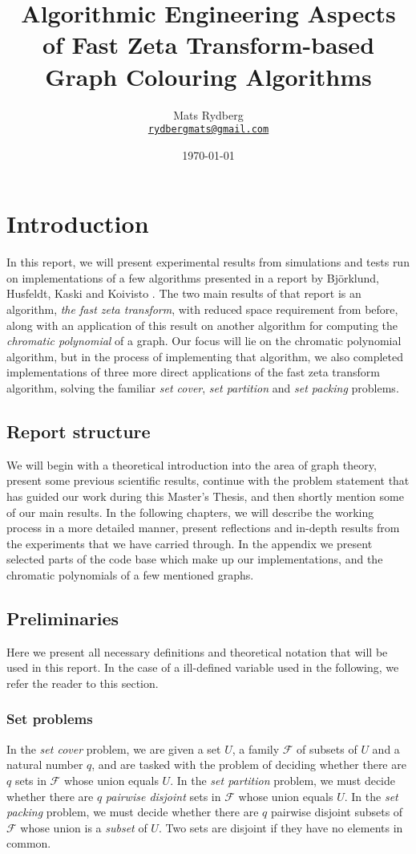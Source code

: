 \documentclass{cslthse-msc}
\title{\huge{Algorithmic Engineering Aspects of Fast Zeta Transform-based Graph Colouring Algorithms}}
\author{Mats Rydberg \\
    {\normalsize \href{mailto:rydbergmats@gmail.com}{\texttt{rydbergmats@gmail.com}}}}
\date{\today}
\begin{document}
\makefrontmatter

\chapter{Introduction}
In this report, we will present experimental results from simulations and tests run on implementations of a few algorithms presented in a report by Björklund, Husfeldt, Kaski and Koivisto \cite{cov_pack}. The two main results of that report is an algorithm, \emph{the fast zeta transform}, with reduced space requirement from before, along with an application of this result on another algorithm for computing the \emph{chromatic polynomial} of a graph. Our focus will lie on the chromatic polynomial algorithm, but in the process of implementing that algorithm, we also completed implementations of three more direct applications of the fast zeta transform algorithm, solving the familiar \emph{set cover}, \emph{set partition} and \emph{set packing} problems.

\section{Report structure}
We will begin with a theoretical introduction into the area of graph theory, present some previous scientific results, continue with the problem statement that has guided our work during this Master's Thesis, and then shortly mention some of our main results. In the following chapters, we will describe the working process in a more detailed manner, present reflections and in-depth results from the experiments that we have carried through. In the appendix we present selected parts of the code base which make up our implementations, and the chromatic polynomials of a few mentioned graphs.

\section{Preliminaries}
Here we present all necessary definitions and theoretical notation that will be used in this report. In the case of a ill-defined variable used in the following, we refer the reader to this section.

\subsection{Set problems} \label{setproblems}
In the \emph{set cover} problem, we are given a set $U$, a family $\mathcal{F}$ of subsets of $U$ and a natural number $q$, and are tasked with the problem of deciding whether there are $q$ sets in $\mathcal{F}$ whose union equals $U$. In the \emph{set partition} problem, we must decide whether there are $q$ \emph{pairwise disjoint} sets in $\mathcal{F}$ whose union equals $U$. In the \emph{set packing} problem, we must decide whether there are $q$ pairwise disjoint subsets of $\mathcal{F}$ whose union is a \emph{subset} of $U$. Two sets are disjoint if they have no elements in common.
\end{document}
